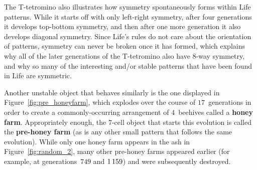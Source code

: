 The T-tetromino also illustrates how symmetry spontaneously forms within Life patterns. While it starts off with only left-right symmetry, after four generations it develops top-bottom symmetry, and then after one more generation it also develops diagonal symmetry. Since Life's rules do not care about the orientation of patterns, symmetry can never be broken once it has formed, which explains why all of the later generations of the T-tetromino also have $8$-way symmetry, and why so many of the interesting and/or stable patterns that have been found in Life are symmetric.

Another unstable object that behaves similarly is the one displayed in Figure~\ref{fig:pre_honeyfarm}, which explodes over the course of $17$~generations in order to create a commonly-occurring arrangement of $4$~beehives called a \textbf{honey farm}. Appropriately enough, the $7$-cell object that starts this evolution is called the \textbf{pre-honey farm} (as is any other small pattern that follows the same evolution). While only one honey farm appears in the ash in Figure~\ref{fig:random_2}, many other pre-honey farms appeared earlier (for example, at generations~$749$ and $1{\,}159$) and were subsequently destroyed.

